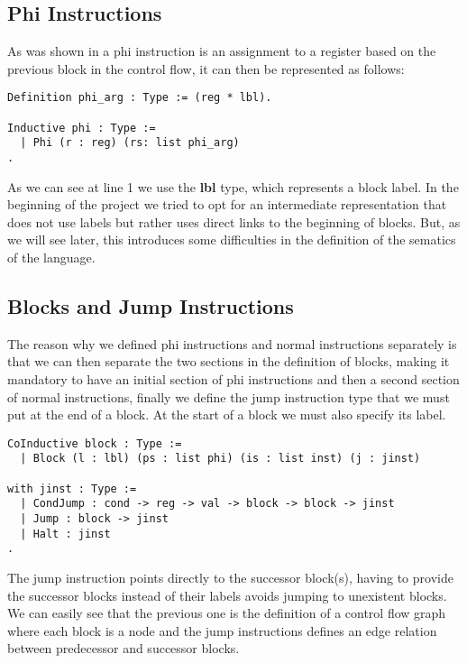 \subsection{Phi Instructions}
As was shown in  a phi instruction is an assignment to a register based on the previous block in the control flow, it can then be represented as follows:

\begin{lstlisting}[language=Coq]
Definition phi_arg : Type := (reg * lbl).

Inductive phi : Type :=
  | Phi (r : reg) (rs: list phi_arg)
.
\end{lstlisting}

As we can see at line 1 we use the \textbf{lbl} type, which represents a block label. In the beginning of the project we tried to opt for an intermediate representation that does not use labels but rather uses direct links to the beginning of blocks. But, as we will see later, this introduces some difficulties in the definition of the sematics of the language.

\subsection{Blocks and Jump Instructions}

The reason why we defined phi instructions and normal instructions separately is that we can then separate the two sections in the definition of blocks, making it mandatory to have an initial section of phi instructions and then a second section of normal instructions, finally we define the jump instruction type that we must put at the end of a block. At the start of a block we must also specify its label.

\begin{lstlisting}[language=Coq]
CoInductive block : Type :=
  | Block (l : lbl) (ps : list phi) (is : list inst) (j : jinst)

with jinst : Type :=
  | CondJump : cond -> reg -> val -> block -> block -> jinst
  | Jump : block -> jinst
  | Halt : jinst
.
\end{lstlisting}

The jump instruction points directly to the successor block(s), having to provide the successor blocks instead of their labels avoids jumping to unexistent blocks.
We can easily see that the previous one is the definition of a control flow graph where each block is a node and the jump instructions defines an edge relation between predecessor and successor blocks.


